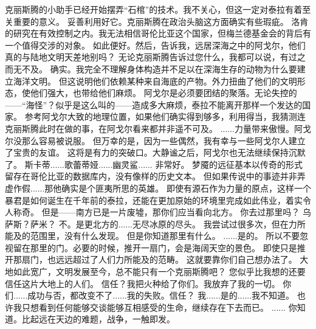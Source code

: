 \documentclass[openany]{book}
\begin{document}
\begin{dialogue}
     克丽斯腾的小助手已经开始摆弄“石棺”的技术。我不关心，但这一定对泰拉有着至关重要的意义。
     妥善利用好它。克丽斯腾在政治头脑这方面确实有些瑕疵。
     洛肯的研究在有效控制之内。我无法相信哥伦比亚这个国家，但梅兰德基金会的背后有一个值得交涉的对象。
     如此便好。然后，告诉我，远居深海之中的阿戈尔，他们真的与陆地文明天差地别吗？
     无论克丽斯腾告诉过您什么，我都可以说，有过之而无不及。
     确实。我完全不理解身体构造并不足以在深海生存的动物为什么要建立海洋文明。
     但这说明他们依赖某种来自海底的产物。外力扭曲了他们的文明形态，使他们强大，也带给他们麻烦。
     阿戈尔是必须要团结的聚落。无论失控的——“海怪”？似乎是这么叫的——造成多大麻烦，泰拉不能离开那样一个发达的国家。
     参考阿戈尔大致的地理位置，如果他们确实得到够多，利用得当，我猜测连克丽斯腾此时在做的事，在阿戈尔看来都并非遥不可及。
     ......力量带来傲慢。阿戈尔没那么容易被说服。
     但万幸的是，因为一些偶然，我有幸与一些阿戈尔人建立了宝贵的友谊。
     这将是有力的突破口。大静谧之后，阿戈尔也无法继续保持沉默了。
     斯卡蒂......歌蕾蒂娅......幽灵鲨......
     非常好。
     梦魇的远征基本以传奇的形式留存在哥伦比亚的数据库内，没有像样的历史文本。
     但如果传说中的事迹并非弄虚作假......那他确实是个匪夷所思的英雄。
     即使有源石作为力量的原点，这样一个暴君是如何诞生在千年前的泰拉，还能在更加原始的环境里完成如此伟业，着实令人称奇。
     但是——南方已是一片废墟，那你们应当看向北方。
     你去过那里吗？
     乌萨斯？萨米？
     不。是更北方的......无尽冰原的尽头。
     我尝试过很多次，但在力所能及的范围里，没有什么发现。
     但是你知道那里有什么。
     ......是的。
     所以不要忽视留在那里的门。必要的时候，推开一扇门，会是海阔天空的景色。
     即使只是推开那扇门，也远远超过了人们力所能及的范畴。
     这就要靠你们自己想办法了。
     大地如此宽广，文明发展至今，总不能只有一个克丽斯腾吧？
     您似乎比我想的还要信任这片大地上的人们。
     信任？我把火种给了你们。我放弃了我的一切。
     你们......成功与否，都改变不了......我的失败。信任？
     我......是的......我不知道。
     也许我只想看到任何能够交谈能够互相感受的生命，继续存在下去而已。
     ......
     你知道。比起远在天边的难题，战争，一触即发。

\end{dialogue}
\end{document}

